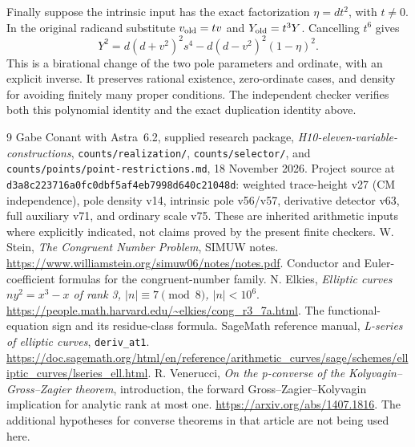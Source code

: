 \documentclass[11pt,a4paper]{article}
\begin{document}
Finally suppose the intrinsic input has the exact factorization
$\eta=dt^2$, with $t\ne0$. In the original radicand substitute
$v_{\rm old}=tv$ and $Y_{\rm old}=t^3Y$. Cancelling $t^6$ gives
\[
 Y^2=d(d+v^2)^2s^4-d(d-v^2)^2(1-\eta)^2.
\]
This is a birational change of the two pole parameters and ordinate, with
an explicit inverse. It preserves rational existence, zero-ordinate
cases, and density for avoiding finitely many proper conditions. The
independent checker verifies both this polynomial identity and the exact
duplication identity above.

\begin{thebibliography}{9}
 Gabe Conant with Astra~6.2, supplied research package,
\emph{H10-eleven-variable-constructions},
\texttt{counts/realization/}, \texttt{counts/selector/}, and
\texttt{counts/points/point-restrictions.md}, 18 November 2026.
 Project source at
\texttt{d3a8c223716a0fc0dbf5af4eb7998d640c21048d}:
weighted trace-height v27 (CM independence), pole density v14,
intrinsic pole v56/v57, derivative detector v63, full auxiliary v71,
and ordinary scale v75. These are inherited arithmetic inputs where
explicitly indicated, not claims proved by the present finite checkers.
 W. Stein, \emph{The Congruent Number Problem}, SIMUW notes.
\url{https://www.williamstein.org/simuw06/notes/notes.pdf}.
Conductor and Euler-coefficient formulas for the congruent-number family.
 N. Elkies, \emph{Elliptic curves $ny^2=x^3-x$ of rank 3,
$|n|\equiv7\pmod8$, $|n|<10^6$}.
\url{https://people.math.harvard.edu/~elkies/cong_r3_7a.html}.
The functional-equation sign and its residue-class formula.
 SageMath reference manual, \emph{L-series of elliptic curves},
\texttt{deriv\_at1}.
\url{https://doc.sagemath.org/html/en/reference/arithmetic_curves/sage/schemes/elliptic_curves/lseries_ell.html}.
 R. Venerucci, \emph{On the p-converse of the
Kolyvagin--Gross--Zagier theorem}, introduction, the forward
Gross--Zagier--Kolyvagin implication for analytic rank at most one.
\url{https://arxiv.org/abs/1407.1816}.
The additional hypotheses for converse theorems in that article are not
being used here.
\end{thebibliography}
\end{document}
